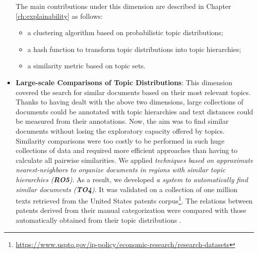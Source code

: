 \begin{itemize}
The main contributions under this dimension are described in Chapter \ref{ch:explainability} as follows:
\begin{itemize}
\item a clustering algorithm based on probabilistic topic distributions;
\item a hash function to transform topic distributions into topic hierarchies;
\item a similarity metric based on topic sets.
\end{itemize} 
\item \textbf{Large-scale Comparisons of Topic Distributions}: This dimension covered the search for similar documents based on their most relevant topics. Thanks to having dealt with the above two dimensions, large collections of documents could be annotated with topic hierarchies and text distances could be measured from their annotations. Now, the aim was to find similar documents without losing the exploratory capacity offered by topics. Similarity comparisons were too costly to be performed in such huge collections of data and required more efficient approaches than having to calculate all pairwise similarities. We applied \textit{techniques based on approximate nearest-neighbors to organize documents in regions with similar topic hierarchies (\textbf{RO5})}. As a result, we developed \textit{a system to automatically find similar documents (\textbf{TO4})}. It was validated on a collection of one million texts retrieved from the United States patents corpus\footnote{\url{https://www.uspto.gov/ip-policy/economic-research/research-datasets}}. The relations between patents derived from their manual categorization were compared with those automatically obtained from their topic distributions \citep{Badenes-Olmedo2020, Badenes-Olmedo2019b}. 


\end{itemize}

